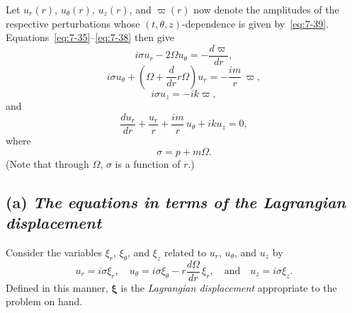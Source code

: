 Let $u_r(r)$, $u_\theta(r)$, $u_z(r)$, and $\varpi(r)$ now denote the amplitudes of the
respective perturbations whose $(t,\theta,z)$-dependence is given by~\eqref{eq:7-39}.
Equations~\eqref{eq:7-35}--\eqref{eq:7-38} then give
\begin{equation}
\label{eq:7-40}
i\sigma u_r - 2\Omega u_\theta = -\frac{d\varpi}{dr},
\end{equation}
\begin{equation}
\label{eq:7-41}
i\sigma u_\theta + \left(\Omega + \frac{d}{dr} r\Omega\right) u_r
= -\frac{im}{r}\,\varpi,
\end{equation}
\begin{equation}
\label{eq:7-42}
i\sigma u_z = -ik\varpi,
\end{equation}
and
\begin{equation}
\label{eq:7-43}
\frac{du_r}{dr} + \frac{u_r}{r} + \frac{im}{r}\, u_\theta + ik u_z = 0,
\end{equation}
where
\begin{equation}
\label{eq:7-44}
\sigma = p + m\Omega.
\end{equation}
(Note that through $\Omega$, $\sigma$ is a function of $r$.)

\subsection*{(a) \emph{The equations in terms of the Lagrangian displacement}}
Consider the variables $\xi_r$, $\xi_\theta$, and $\xi_z$ related to $u_r$, $u_\theta$, and $u_z$ by
\begin{equation}
\label{eq:7-45}
u_r = i\sigma \xi_r, \quad
u_\theta = i\sigma \xi_\theta - r\frac{d\Omega}{dr}\,\xi_r, \quad \text{and} \quad
u_z = i\sigma \xi_z.
\end{equation}
Defined in this manner, $\boldsymbol{\xi}$ is the \emph{Lagrangian displacement} appropriate to
the problem on hand.

